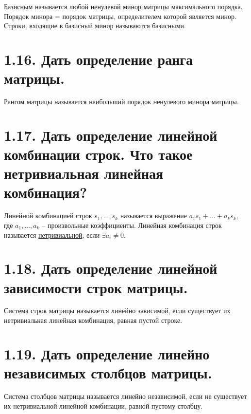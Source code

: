 \documentclass{article}
\begin{document}
Базисным называется любой ненулевой минор матрицы максимального порядка. Порядок минора = порядок матрицы, определителем которой является минор.
\newline Строки, входящие в базисный минор называются базисными.

\section*{\LARGE 1.16. Дать определение ранга матрицы.  }

Рангом матрицы называется наибольший порядок ненулевого минора матрицы.

\section*{\LARGE 1.17. Дать определение линейной комбинации строк. Что такое нетривиальная линейная комбинация?  }

Линейной комбинацией строк $s_1, ..., s_k$ называется выражение $a_1s_1 + ... + a_ks_k$, где $a_1, ... , a_k$ -- произвольные коэффициенты.
\newline Линейная комбинация строк называется \underline{нетривиальной}, если $\exists a_i \ne 0$.

\section*{\LARGE 1.18. Дать определение линейной зависимости строк матрицы.  }

Система строк матрицы называется линейно зависимой, если существует их нетривиальная линейная комбинация, равная пустой строке.

\section*{\LARGE 1.19. Дать определение линейно независимых столбцов матрицы.  }

Система столбцов матрицы называется линейно независимой, если не существует их нетривиальной линейной комбинации, равной пустому столбцу.
\end{document}
